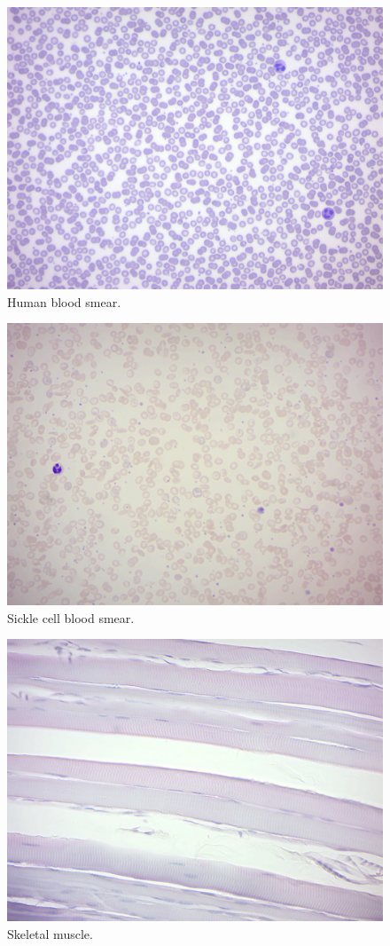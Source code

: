 \begin{figure}

{\centering \includegraphics[width=0.7\linewidth]{./figures/tissues/blood_smear}

}

\caption{Human blood smear.}\label{fig:bloodsmear}
\end{figure}

\begin{figure}

{\centering \includegraphics[width=0.7\linewidth]{./figures/tissues/sickle_cell}

}

\caption{Sickle cell blood smear.}\label{fig:sickle}
\end{figure}


\begin{figure}

{\centering \includegraphics[width=0.7\linewidth]{./figures/tissues/skeletal_muscle}

}

\caption{Skeletal muscle.}\label{fig:skeletal}
\end{figure}

